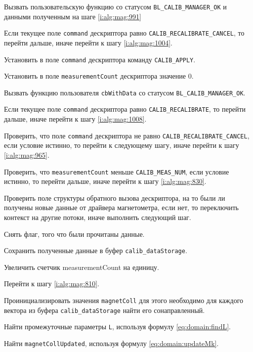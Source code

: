 \begin{enumerate_step}
    \item Вызвать пользовательскую функцию со статусом \lstinline|BL_CALIB_MANAGER_OK| и данными полученным на шаге \ref{i:alg:mag:991}
    \item \label{i:alg:mag:997} Если текущее поле \lstinline|command| дескриптора равно \lstinline|CALIB_RECALIBRATE_CANCEL|, то перейти дальше, иначе перейти к шагу
    \ref{i:alg:mag:1004}.
    \item Установить в поле \lstinline|command| дескриптора команду \lstinline|CALIB_APPLY|.
    \item Установить в поле \lstinline|measurementCount| дескриптора значение 0.
    \item Вызвать функцию пользователя \lstinline|cbWithData| со статусом \lstinline|BL_CALIB_MANAGER_OK|.
    \item \label{i:alg:mag:1004} Если текущее поле \lstinline|command| дескриптора равно \lstinline|CALIB_RECALIBRATE|, то перейти дальше, иначе перейти к шагу
    \ref{i:alg:mag:1008}.
    \item \label{i:alg:mag:810} Проверить, что поле \lstinline|command| дескриптора не равно \lstinline|CALIB_RECALIBRATE_CANCEL|, если условие истинно, то перейти к следующему шагу, иначе
    перейти к шагу \ref{i:alg:mag:965}.
    \item Проверить, что \lstinline|measurementCount| меньше \lstinline|CALIB_MEAS_NUM|, если условие истинно, то перейти дальше, иначе перейти к шагу \ref{i:alg:mag:830}.
    \item Проверить поле структуры обратного вызова дескриптора, на то были ли получены новые данные от драйвера магнетометра, 
    если нет, то переключить контекст на другие потоки, иначе выполнить следующий шаг.
    \item Снять флаг, того что были прочитаны данные.
    \item Сохранить полученные данные в буфер \lstinline|calib_dataStorage|.
    \item Увеличить счетчик measurementCount на единицу.
    \item Перейти к шагу \ref{i:alg:mag:810}.
    \item \label{i:alg:mag:830} Проинициализировать значения \lstinline|magnetColl| для этого необходимо для каждого вектора из буфера \lstinline|calib_dataStorage| найти его сонаправленный.
    \item \label{i:alg:mag:FindL} Найти промежуточные параметры \lstinline|L|, используя формулу \ref{eq:domain:findL}.
    \item Найти \lstinline|magnetCollUpdated|, используя формулу \ref{eq:domain:updateMk}.

\end{enumerate_step}
